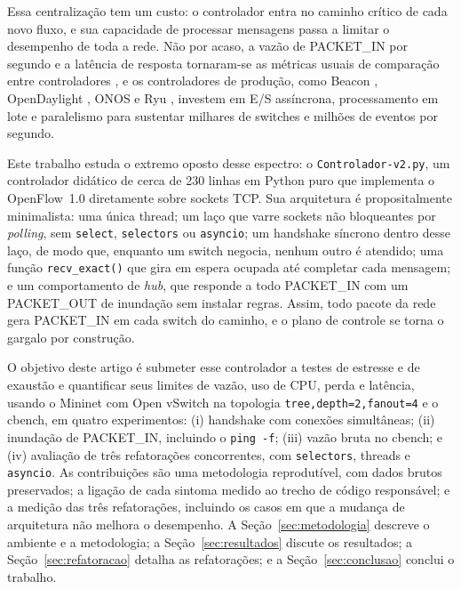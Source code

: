 \documentclass[12pt]{article}
\begin{document}
Essa centralização tem um custo: o controlador entra no caminho crítico de cada novo
fluxo, e sua capacidade de processar mensagens passa a limitar o desempenho de toda a
rede. Não por acaso, a vazão de PACKET\_IN por segundo e a latência de resposta tornaram-se
as métricas usuais de comparação entre controladores
\cite{tootoonchian2012controller,erickson2013beacon,zhu2019benchmarking}, e os
controladores de produção, como Beacon \cite{erickson2013beacon},
OpenDaylight \cite{medved2014odl}, ONOS \cite{berde2014onos} e Ryu \cite{ryu}, investem
em E/S assíncrona, processamento em lote e paralelismo para sustentar milhares de
switches e milhões de eventos por segundo.

Este trabalho estuda o extremo oposto desse espectro: o \texttt{Controlador-v2.py}, um
controlador didático de cerca de 230 linhas em Python puro que implementa o OpenFlow~1.0
diretamente sobre sockets TCP. Sua arquitetura é propositalmente minimalista: uma única
thread; um laço que varre sockets não bloqueantes por \textit{polling}, sem
\texttt{select}, \texttt{selectors} ou \texttt{asyncio}; um handshake síncrono dentro
desse laço, de modo que, enquanto um switch negocia, nenhum outro é atendido; uma função
\texttt{recv\_exact()} que gira em espera ocupada até completar cada mensagem; e um
comportamento de \textit{hub}, que responde a todo PACKET\_IN com um PACKET\_OUT de
inundação sem instalar regras. Assim, todo pacote da rede gera PACKET\_IN em cada switch
do caminho, e o plano de controle se torna o gargalo por construção.

O objetivo deste artigo é submeter esse controlador a testes de estresse e de exaustão
e quantificar seus limites de vazão, uso de CPU, perda e latência, usando o Mininet
\cite{lantz2010mininet} com Open vSwitch \cite{pfaff2015ovs} na topologia
\texttt{tree,depth=2,fanout=4} e o cbench, em quatro experimentos: (i) handshake com
conexões simultâneas; (ii) inundação de PACKET\_IN, incluindo o \texttt{ping -f}; (iii)
vazão bruta no cbench; e (iv) avaliação de três refatorações concorrentes, com
\texttt{selectors}, threads e \texttt{asyncio}. As contribuições são uma metodologia
reprodutível, com dados brutos preservados; a ligação de cada sintoma medido ao trecho
de código responsável; e a medição das três refatorações, incluindo os casos em que a
mudança de arquitetura não melhora o desempenho. A Seção~\ref{sec:metodologia} descreve
o ambiente e a metodologia; a Seção~\ref{sec:resultados} discute os resultados; a
Seção~\ref{sec:refatoracao} detalha as refatorações; e a Seção~\ref{sec:conclusao}
conclui o trabalho.
\end{document}
